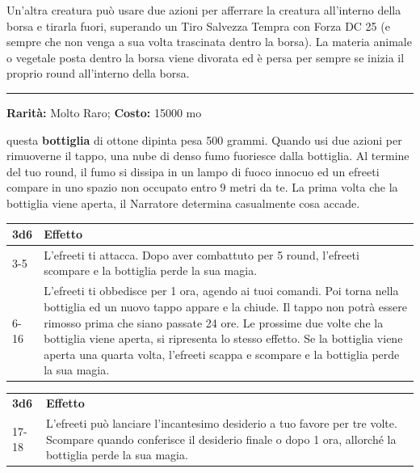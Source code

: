 \begin{multicols}{2}
Un'altra creatura può usare due azioni per afferrare la creatura all'interno della borsa e tirarla fuori, superando un Tiro Salvezza Tempra con Forza DC 25 (e sempre che non venga a sua volta trascinata dentro la borsa). La materia animale o vegetale posta dentro la borsa viene divorata ed è persa per sempre se inizia il proprio round all'interno della borsa.

\smallskip\noindent\rule{\linewidth}{2pt}  \hypertarget{Bottigliadell'Efreeti}{}\smallskip{}\noindent\label{Bottigliadell'Efreeti}

\textbf{Rarità:} Molto Raro; \textbf{Costo:} 15000 mo

questa \textbf{bottiglia} di ottone dipinta pesa 500 grammi. Quando usi due azioni per rimuoverne il tappo, una nube di denso fumo fuoriesce dalla bottiglia. Al termine del tuo round, il fumo si dissipa in un lampo di fuoco innocuo ed un efreeti compare in uno spazio non occupato entro 9 metri da te. La prima volta che la bottiglia viene aperta, il Narratore determina casualmente cosa accade.

\medskip

\noindent\begin{tabularx}{0.45\textwidth}{lX}
	\toprule
\textbf{3d6} &\textbf{Effetto}\\
\toprule
3-5 & L'efreeti ti attacca. Dopo aver combattuto per 5 round, l'efreeti scompare e la bottiglia perde la sua magia.\\
6-16 &L'efreeti ti obbedisce per 1 ora, agendo ai tuoi comandi. Poi torna nella bottiglia ed un nuovo tappo appare e la chiude. Il tappo non potrà essere rimosso prima che siano passate 24 ore. Le prossime due volte che la bottiglia viene aperta, si ripresenta lo stesso effetto. Se la bottiglia viene aperta una quarta volta, l'efreeti scappa e scompare e la bottiglia perde la sua magia.\\
\end{tabularx}
\noindent\begin{tabularx}{0.45\textwidth}{lX}
\textbf{3d6} &\textbf{Effetto}\\

17-18 & L'efreeti può lanciare l'incantesimo desiderio a tuo favore per tre volte. Scompare quando conferisce il desiderio finale o dopo 1 ora, allorché la bottiglia perde la sua magia.
\end{tabularx}


\end{multicols}

